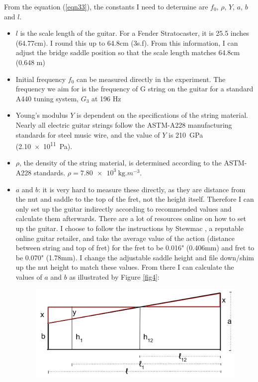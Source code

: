From the equation (\ref{eqn33}), the constants I need to determine are $f_0$, $\rho$, $Y$, $a$, $b$ and $l$. 
\begin{itemize}
    \item $l$ is the scale length of the guitar. For a Fender Stratocaster, it is 25.5 inches (64.77cm). \cite{scale} I round this up to 64.8cm (3s.f). From this information, I can adjust the bridge saddle position so that the scale length matches 64.8cm (0.648 m)
    \item Initial frequency $f_0$ can be measured directly in the experiment. The frequency we aim for is the frequency of G string on the guitar for a standard A440 tuning system, $G_3$ at 196 Hz \cite{freq_chart}
    \item Young's modulus $Y$ is dependent on the specifications of the string material. Nearly all electric guitar strings follow the ASTM-A228 manufacturing standards for steel music wire, and the value of $Y$ is \SI{210}{\giga\pascal} (\SI{2.10e11}{\pascal}). \cite{astm} 
    \item $\rho$, the density of the string material, is determined according to the ASTM-A228 standards. $\rho = \SI{7.80e3}{\kg.m^{-3}}$. \cite{astm}
    \item $a$ and $b$: it is very hard to measure these directly, as they are distance from the nut and saddle to the top of the fret, not the height itself. Therefore I can only set up the guitar indirectly according to recommended values and calculate them afterwards. There are a lot of resources online on how to set up the guitar. I choose to follow the instructions by Stewmac \cite{stewmac}, a reputable online guitar retailer, and take the average value of the action (distance between string and top of fret) for the  fret to be 0.016" (0.406mm) and  fret to be 0.070" (1.78mm). I change the adjustable saddle height and file down/shim up the nut height to match these values. From there I can calculate the values of $a$ and $b$ as illustrated by Figure \ref{fig4}: \par
    \begin{figure}[ht]
        \includegraphics[width = \textwidth]{./ee/fig4.png}

\end{figure}
\end{itemize}
